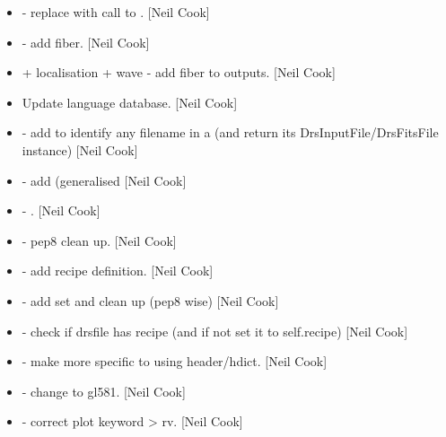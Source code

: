 \documentclass[a4paper,10pt,english]{report}
\begin{document}
\begin{itemize}
\item {} 
 - replace  with call to
. {[}Neil Cook{]}

\item {} 
 - add fiber. {[}Neil Cook{]}

\item {} 
 + localisation + wave - add fiber to
outputs. {[}Neil Cook{]}

\item {} 
Update language database. {[}Neil Cook{]}

\item {} 
 - add  to identify any filename in a
 (and return its DrsInputFile/DrsFitsFile instance) {[}Neil
Cook{]}

\item {} 
 - add 
(generalised  {[}Neil Cook{]}

\item {} 
 -
. {[}Neil Cook{]}

\item {} 
 - pep8 clean up. {[}Neil Cook{]}

\item {} 
 - add  recipe
definition. {[}Neil Cook{]}

\item {} 
 - add  set and clean
up (pep8 wise) {[}Neil Cook{]}

\item {} 
 - check if drsfile has recipe (and if not set it
to self.recipe) {[}Neil Cook{]}

\item {} 
 - make  more specific to using
header/hdict. {[}Neil Cook{]}

\item {} 
 - change to gl581. {[}Neil
Cook{]}

\item {} 
 - correct plot keyword  \textendash{}\textgreater{} rv.
{[}Neil Cook{]}

\end{itemize}
\end{document}

